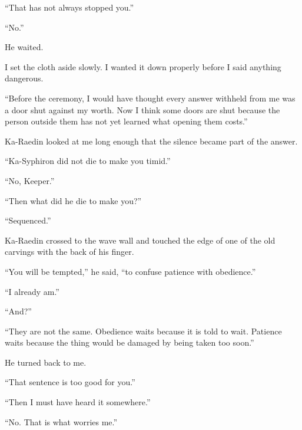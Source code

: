 ``That has not always stopped you.''\par

``No.''\par

He waited.\par

I set the cloth aside slowly. I wanted it down properly before I said anything dangerous.\par

``Before the ceremony, I would have thought every answer withheld from me was a door shut against my worth. Now I think some doors are shut because the person outside them has not yet learned what opening them costs.''\par

Ka-Raedin looked at me long enough that the silence became part of the answer.\par

``Ka-Syphiron did not die to make you timid.''\par

``No, Keeper.''\par

``Then what did he die to make you?''\par

``Sequenced.''\par

Ka-Raedin crossed to the wave wall and touched the edge of one of the old carvings with the back of his finger.\par

``You will be tempted,'' he said, ``to confuse patience with obedience.''\par

``I already am.''\par

``And?''\par

``They are not the same. Obedience waits because it is told to wait. Patience waits because the thing would be damaged by being taken too soon.''\par

He turned back to me.\par

``That sentence is too good for you.''\par

``Then I must have heard it somewhere.''\par

``No. That is what worries me.''\par

